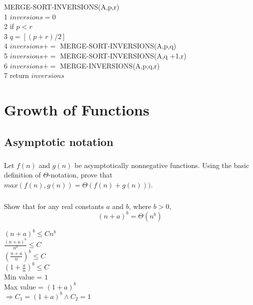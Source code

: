 \documentclass[a4paper,12pt]{article}
\begin{document}
\begin{enumerate}
    MERGE-SORT-INVERSIONS(A,p,r)\\
    1 $inversions = 0$ \\
    2 if $p<r$ \\
    3 \hspace{0.5cm} $ q = [(p+r)/2]$ \\
    4 \hspace{0.5cm} $inversions +=$ MERGE-SORT-INVERSIONS(A,p,q) \\
    5 \hspace{0.5cm} $inversions +=$ MERGE-SORT-INVERSIONS(A,q +1,r) \\
    6 \hspace{0.5cm} $inversions +=$ MERGE-INVERSIONS(A,p,q,r) \\
    7 return $inversions$ \\
     \end{enumerate}
    
 \section{Growth of Functions}
  \subsection{Asymptotic notation}
   \subsubsection{} Let $f(n)$ and $g(n)$ be asymptotically nonnegative functions.
   Using the basic definition of $\Theta$-notation, prove that $max(f(n),g(n))=\Theta(f(n)+g(n)))$.
   
   \subsubsection{} Show that for any real constants $a$ and $b$,
   where $b>0$, $$(n+a)^b = \Theta(n^b)$$
   
   \begin{center}
   $(n+a)^b \leq Cn^b$ \\
   $\frac{(n+a)^b}{n^b} \leq C$ \\
   $(\frac{n+a}{n})^b \leq C$ \\
   $(1 + \frac{a}{n})^b \leq C$ \\
   Min value = $1$ \\
   Max value = $(1 + a)^b$ \\
   $\Rightarrow C_{1} = (1+a)^b \wedge C_{2} = 1$
   
   \end{center}
\end{document}

